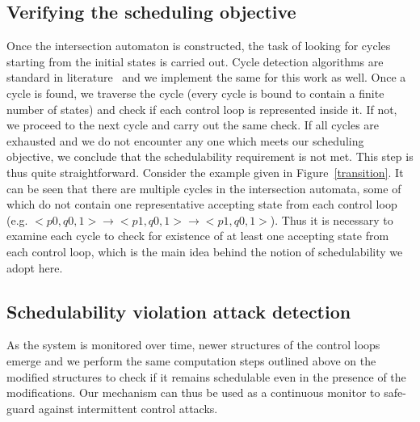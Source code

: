 \begin{figure}
\begin{center}
\end{center}
\label{fig:Algorithm}
\end{figure}

\subsection{Verifying the scheduling objective}
\noindent
Once the intersection automaton is constructed, the task of looking for cycles starting from the initial states is carried out. Cycle detection algorithms are standard in literature~\cite{Clarke:2000:MC:332656} and we implement the same for this work as well. Once a cycle is found, we traverse the cycle (every cycle is bound to contain a finite number of states) and check if each control loop is represented inside it. If not, we proceed to the next cycle and carry out the same check. If all cycles are exhausted and we do not encounter any one which meets our scheduling objective, we conclude that the schedulability requirement is not met. This step is thus quite straightforward. Consider the example given in Figure~\ref{transition}. It can be seen that there are multiple cycles in the intersection automata, some of which do not contain one representative accepting state from each control loop (e.g. $<p0,q0,1> \rightarrow <p1,q0,1> \rightarrow <p1,q0,1>$). Thus it is necessary to examine each cycle to check for existence of at least one accepting state from each control loop, which is the main idea behind the notion of schedulability we adopt here. 

\subsection{Schedulability violation attack detection}
\noindent
As the system is monitored over time, newer structures of the control loops emerge and we perform the same computation steps outlined above on the modified structures to check if it remains schedulable even in the presence of the modifications. Our mechanism can thus be used as a continuous monitor to safe-guard against intermittent control attacks. 

